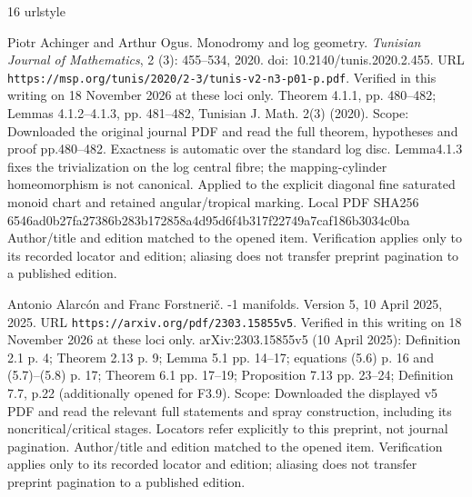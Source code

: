 \documentclass[11pt,a4paper]{article}
\theoremstyle{definition}
\begin{document}
\clearpage
\begin{thebibliography}{16}
\providecommand{\natexlab}[1]{#1}
\providecommand{\url}[1]{\texttt{#1}}
\expandafter\ifx\csname urlstyle\endcsname\relax
  \providecommand{\doi}[1]{doi: #1}\else
  \providecommand{\doi}{doi: \begingroup \urlstyle{rm}\Url}\fi

Piotr Achinger and Arthur Ogus.
\newblock Monodromy and log geometry.
\newblock \emph{Tunisian Journal of Mathematics}, 2 (3):
  455--534, 2020.
\newblock \doi{10.2140/tunis.2020.2.455}.
\newblock URL \url{https://msp.org/tunis/2020/2-3/tunis-v2-n3-p01-p.pdf}.
\newblock Verified in this writing on 18 November 2026 at these loci only.
  Theorem 4.1.1, pp. 480–482;\allowbreak{} Lemmas 4.1.2–4.1.3, pp. 481–482, Tunisian
  J. Math. 2(3) (2020). Scope: Downloaded the original journal PDF and read the
  full theorem, hypotheses and proof pp.480–482. Exactness is automatic over
  the standard log disc. Lemma4.1.3 fixes the trivialization on the log central
  fibre;\allowbreak{} the mapping-cylinder homeomorphism is not canonical. Applied to the
  explicit diagonal fine saturated monoid chart and retained angular/tropical
  marking. Local PDF SHA256
  6546ad0b27fa27386b283b172858a4d95d6f4b317f22749a7caf186b3034c0ba Author/title
  and edition matched to the opened item. Verification applies only to its
  recorded locator and edition;\allowbreak{} aliasing does not transfer preprint pagination
  to a published edition.

Antonio Alarc{\'o}n and Franc Forstneri{\v c}.
-1 manifolds.
\newblock Version 5, 10 April 2025, 2025.
\newblock URL \url{https://arxiv.org/pdf/2303.15855v5}.
\newblock Verified in this writing on 18 November 2026 at these loci only.
  arXiv:2303.15855v5 (10 April 2025): Definition 2.1 p. 4;\allowbreak{} Theorem 2.13 p. 9;\allowbreak{}
  Lemma 5.1 pp. 14–17;\allowbreak{} equations (5.6) p. 16 and (5.7)–(5.8) p. 17;\allowbreak{} Theorem
  6.1 pp. 17–19;\allowbreak{} Proposition 7.13 pp. 23–24;\allowbreak{} Definition 7.7, p.22
  (additionally opened for F3.9). Scope: Downloaded the displayed v5 PDF and
  read the relevant full statements and spray construction, including its
  noncritical/critical stages. Locators refer explicitly to this preprint, not
  journal pagination. Author/title and edition matched to the opened item.
  Verification applies only to its recorded locator and edition;\allowbreak{} aliasing does
  not transfer preprint pagination to a published edition.


\end{thebibliography}
\end{document}
